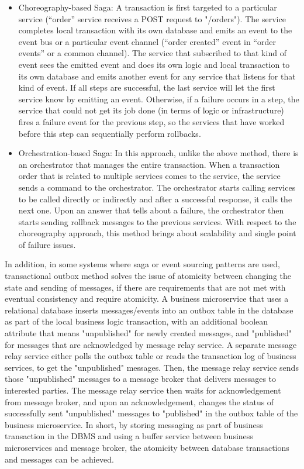 \documentclass{Configuration_Files/PoliMi3i_thesis}
\begin{document}
\begin{itemize}
    \item Choreography-based Saga: A transaction is first targeted to a particular service (“order” service receives a POST request to "/orders").
    The service completes local transaction with its own database and emits an event to the event bus or a particular event channel (“order created” event in “order events” or a common channel).
    The service that subscribed to that kind of event sees the emitted event and does its own logic and local transaction to its own database and emits another event for any service that listens for that kind of event.
    If all steps are successful, the last service will let the first service know by emitting an event.
    Otherwise, if a failure occurs in a step, the service that could not get its job done (in terms of logic or infrastructure) fires a failure event for the previous step, so the services that have worked before this step can sequentially perform rollbacks.
    
    \item Orchestration-based Saga: In this approach, unlike the above method, there is an orchestrator that manages the entire transaction.
    When a transaction order that is related to multiple services comes to the service, the service sends a command to the orchestrator.
    The orchestrator starts calling services to be called directly or indirectly and after a successful response, it calls the next one. Upon an answer that tells about a failure, the orchestrator then starts sending rollback messages to the previous services.
    With respect to the choreography approach, this method brings about scalability and single point of failure issues.
\end{itemize}

In addition, in some systems where saga or event sourcing patterns are used, transactional outbox method solves the issue of atomicity between changing the state and sending of messages, if there are requirements that are not met with eventual consistency and require atomicity.
A business microservice that uses a relational database inserts messages/events into an outbox table in the database as part of the local business logic transaction, with an additional boolean attribute that means "unpublished" for newly created messages, and "published" for messages that are acknowledged by message relay service.
A separate message relay service either polls the outbox table or reads the transaction log of business services, to get the "unpublished" messages.
Then, the message relay service sends those "unpublished" messages to a message broker that delivers messages to interested parties.
The message relay service then waits for acknowledgement from message broker, and upon an acknowledgement, changes the status of successfully sent "unpublished" messages to "published" in the outbox table of the business microservice.
In short, by storing messaging as part of business transaction in the DBMS and using a buffer service between business microservices and message broker, the atomicity between database transactions and messages can be achieved.
\end{document}
